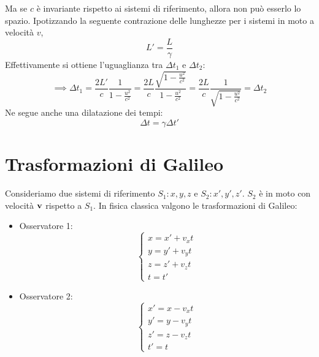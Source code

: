 Ma se $c$ è invariante rispetto ai sistemi di riferimento, allora non può esserlo lo spazio.
Ipotizzando la seguente contrazione delle lunghezze per i sistemi in moto a velocità $v$,
\begin{equation}
    L' = \frac{L}{\gamma}
\end{equation}
Effettivamente si ottiene l'uguaglianza tra $\Delta t_1$ e $\Delta t_2$:
\begin{equation}
    \implies \Delta t_1 = \frac{2 L'}{c} \frac{1}{1 - \frac{u^2}{c^2}}
    = \frac{2 L}{c} \frac{\sqrt{1 - \frac{u^2}{c^2}}}{1 - \frac{u^2}{c^2}}
    = \frac{2 L}{c} \frac{1}{\sqrt{1 - \frac{u^2}{c^2}}}
    = \Delta t_2
\end{equation}
Ne segue anche una dilatazione dei tempi:
\begin{equation}
    \Delta t = \gamma \Delta t'
\end{equation}

\section{Trasformazioni di Galileo}

Consideriamo due sistemi di riferimento $S_1: x, y, z$ e $S_2: x', y', z'$.
$S_2$ è in moto con velocità $\mathbf{v}$ rispetto a $S_1$.
In fisica classica valgono le trasformazioni di Galileo:
\begin{itemize}
    \item Osservatore 1:
        \begin{equation}
            \begin{cases}
                x = x' + v_x t \\
                y = y' + v_y t \\
                z = z' + v_z t \\
                t = t'
            \end{cases}
        \end{equation}
    \item Osservatore 2:
        \begin{equation}
            \begin{cases}
                x' = x - v_x t \\
                y' = y - v_y t \\
                z' = z - v_z t \\
                t' = t
            \end{cases}
        \end{equation}
\end{itemize}

